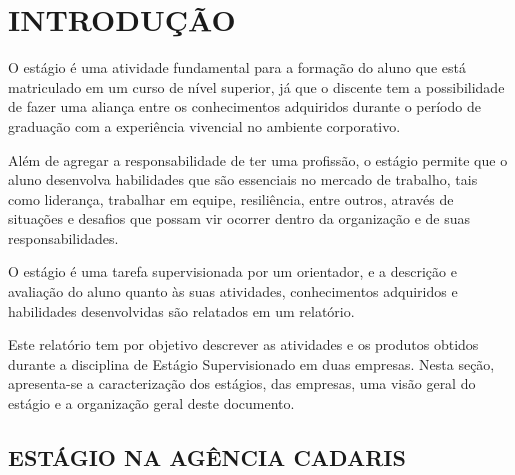 \documentclass[
  12pt,				%
  openany,
  oneside,
  a4paper,			%
  english,			%
  brazil
]{article}
\numberwithin{figure}{section}
\numberwithin{table}{section}
\begin{document}

\begin{titlepage}

\begin{singlespace}
  \listoffigures
\end{singlespace}

\end{titlepage}






\begin{titlepage}

\begin{singlespace}
  {\small
    \tableofcontents
  }
\end{singlespace}

\end{titlepage}



\section{INTRODUÇÃO}

O estágio é uma atividade fundamental para a formação do aluno que está matriculado em um curso de nível superior, já que o discente tem a possibilidade de fazer uma aliança entre os conhecimentos adquiridos durante o período de graduação com a experiência vivencial no ambiente corporativo.

Além de agregar a responsabilidade de ter uma profissão, o estágio permite que o aluno desenvolva habilidades que são essenciais no mercado de trabalho, tais como liderança, trabalhar em equipe, resiliência, entre outros, através de situações e desafios que possam vir ocorrer dentro da organização e de suas responsabilidades.

O estágio é uma tarefa supervisionada por um orientador, e a descrição e avaliação do aluno quanto às suas atividades, conhecimentos adquiridos e habilidades desenvolvidas são relatados em um relatório.

Este relatório tem por objetivo descrever as atividades e os produtos obtidos durante a disciplina de Estágio Supervisionado em duas empresas. Nesta seção, apresenta-se a caracterização dos estágios, das empresas, uma visão geral do estágio e a organização geral deste documento.


\subsection{ESTÁGIO NA AGÊNCIA CADARIS}
\end{document}
